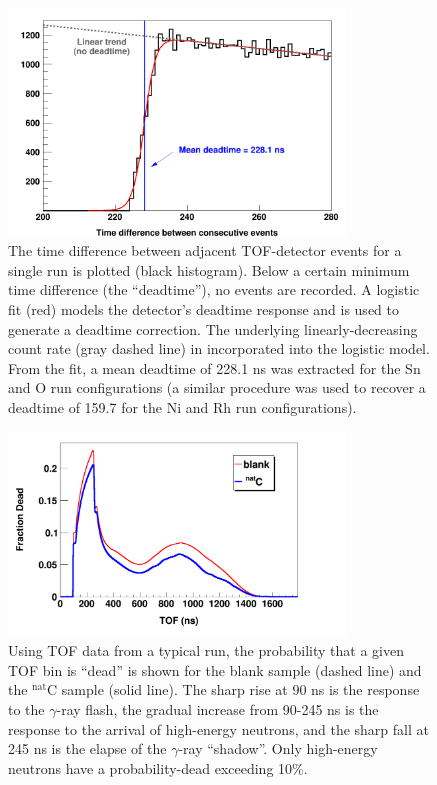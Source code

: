 \begin{figure}[tb]
    \centering
    \includegraphics[width=0.8\textwidth]{figures/TimeDifferenceBetweenEvents.png}
    \caption[The time difference between consecutive events in the time-of-flight detector]
    {The time difference between adjacent TOF-detector
    events for a single run is plotted (black histogram). Below a certain
minimum time difference (the ``deadtime''), no events are recorded. A logistic
fit (red) models the detector's deadtime response and is used to generate a
deadtime correction. The underlying linearly-decreasing count rate (gray dashed
line) in incorporated into the logistic model. From the fit, a mean deadtime of
228.1 ns was extracted for the Sn and O run configurations (a similar
procedure was used to recover a deadtime of 159.7 for the Ni and Rh
run configurations).}
    \label{TimeDifferenceBetweenEvents}
\end{figure}

\begin{figure}[tb]
    \centering
    \includegraphics[width=0.8\textwidth]{figures/exampleDeadtimeSpectrum.png}
    \caption[Digitizer busy probability as a function of time within micropulse]
    {Using TOF data from a typical run, the probability that a given 
        TOF bin is ``dead'' is shown for the blank sample (dashed line) and the 
        $^{\text{nat}}$C   
        sample (solid line). The sharp rise at 90 ns is the response to the
        $\gamma$-ray flash, the gradual increase from 90-245 ns is the response to
        the arrival of high-energy neutrons, and the sharp fall at 245 ns
        is the elapse of the $\gamma$-ray ``shadow''. Only high-energy neutrons
        have a probability-dead exceeding 10\%.}
    \label{ExampleDeadtimeSpectrum}
\end{figure}

